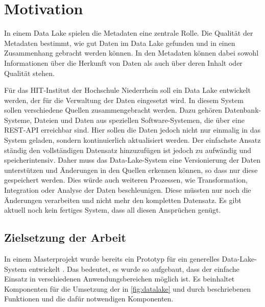 \pagebreak

\section{Motivation}
\label{sec:einleitung-motivation}

In einem Data Lake spielen die Metadaten eine zentrale Rolle.
Die Qualität der Metadaten bestimmt, wie gut Daten im Data Lake gefunden und in einen Zusammenhang gebracht werden können.
In den Metadaten können dabei sowohl Informationen über die Herkunft von Daten als auch über deren Inhalt oder Qualität stehen.

Für das HIT-Institut der Hochschule Niederrhein soll ein Data Lake entwickelt werden, der für die Verwaltung der Daten eingesetzt wird.
In diesem System sollen verschiedene Quellen zusammengebracht werden.
Dazu gehören Datenbank-Systeme, Dateien und Daten aus speziellen Software-Systemen, die über eine REST-API erreichbar sind.
Hier sollen die Daten jedoch nicht nur einmalig in das System geladen, sondern kontinuierlich aktualisiert werden.
Der einfachste Ansatz ständig den vollständigen Datensatz hinzuzufügen ist jedoch zu aufwändig und speicherintensiv.
Daher muss das Data-Lake-System eine Versionierung der Daten unterstützen und Änderungen in den Quellen erkennen können, so dass nur diese gespeichert werden.
Dies würde auch weiteren Prozessen, wie Transformation, Integration oder Analyse der Daten beschleunigen.
Diese müssten nur noch die Änderungen verarbeiten und nicht mehr den kompletten Datensatz.
Es gibt aktuell noch kein fertiges System, dass all diesen Ansprüchen genügt.

\subsection{Zielsetzung der Arbeit}
\label{sec:ziel}
In einem Masterprojekt wurde bereits ein Prototyp für ein generelles Data-Lake-System entwickelt \parencite{prototyp}.
Das bedeutet, es wurde so aufgebaut, dass der einfache Einsatz in verschiedenen Anwendungsbereichen möglich ist.
Es beinhaltet Komponenten für die Umsetzung der in \cref{fig:datalake} und durch \citeauthor{datalake_03} beschriebenen Funktionen und die dafür notwendigen Komponenten.

